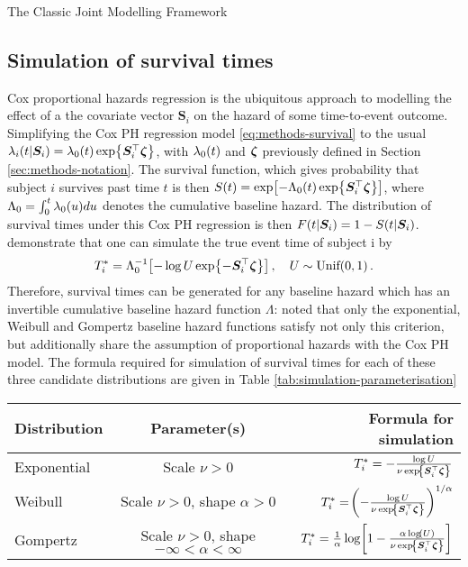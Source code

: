 \begin{chapter}{\label{cha:methods-classic}The Classic Joint Modelling Framework}
  \subsection{\label{sec:sim-survtime}Simulation of survival times}
  Cox proportional hazards regression is the ubiquitous approach to modelling the effect of a the covariate vector $\bm{S}_i$ on the hazard of some time-to-event outcome. Simplifying the Cox PH regression model \eqref{eq:methods-survival} to the usual $\lambda_i\!\left( t|\bm{S}_i\right)=\lambda_0(t)\exp\!\left\{ \bm{S}_i^\top\bm{\zeta}\right\}$, with $\lambda_0(t)$ and $\bm{\zeta}$ previously defined in Section \ref{sec:methods-notation}. The survival function, which gives probability that subject $i$ survives past time $t$ is then $S(t)=\exp\!\left[-\Lambda_0(t)\exp\!\left\{\bm{S}_i^\top\bm{\zeta}\right\}\right]$, where $\Lambda_0=\int_0^t\lambda_0(u)du$ denotes the cumulative baseline hazard. The distribution of survival times under this Cox PH regression is then $F\!\left( t|\bm{S}_i\right)=1-S(t|\bm{S}_i)$. \citet{Bender2005} demonstrate that one can simulate the true event time of subject i by
  \begin{align*}
      T_i^*=\Lambda_0^{-1}\!\left[-\log U\exp\!\left\{-\bm{S}_i^\top\bm{\zeta}\right\}\right],\quad U\sim\text{Unif}\!\left(0,1\right).
  \end{align*}
  Therefore, survival times can be generated for any baseline hazard which has an invertible cumulative baseline hazard function $\Lambda$: \citet{Bender2005} noted that only the exponential, Weibull and Gompertz baseline hazard functions satisfy not only this criterion, but additionally share the assumption of proportional hazards with the Cox PH model. The formula required for simulation of survival times for each of these three candidate distributions are given in Table \ref{tab:simulation-parameterisation}
  \begin{table}[t]
      \centering
      \small
      \begin{tabular}{lcr}
           Distribution & Parameter(s) & Formula for simulation \\ \midrule
           Exponential  &  Scale $\nu>0$ & $T_i^*=-\frac{\log U}{\nu\exp\!\left\{\bm{S}_i^\top\bm{\zeta}\right\}}$\\
           Weibull & Scale $\nu>0$, shape $\alpha>0$ & $T_i^*=\!\left(-\frac{\log U}{\nu\exp\!\left\{\bm{S}_i^\top\bm{\zeta}\right\}}\right)^{1/\alpha}$\\
           Gompertz &  Scale $\nu>0$, shape $-\infty<\alpha<\infty$ & $T_i^*=\frac{1}{\alpha}\log\!\left[1-\frac{\alpha\log\!\left( U\right)}{\nu\exp\!\left\{\bm{S}_i^\top\bm{\zeta}\right\}}\right]$
      \end{tabular}

\end{table}
\end{chapter}
